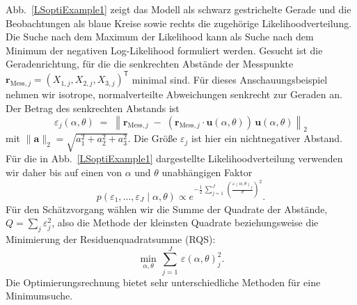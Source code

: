 Abb.~\ref{LSoptiExample1} zeigt das Modell als schwarz gestrichelte Gerade und die
Beobachtungen als blaue Kreise sowie rechts die zugehörige Likelihoodverteilung. Die Suche
nach dem Maximum der Likelihood kann als Suche nach dem Minimum der negativen
Log-Likelihood formuliert werden. Gesucht ist die Geradenrichtung, für die die
senkrechten Abstände der Messpunkte
$\mathbf{r}_{\mathrm{Mess},j}=(X_{1,j},X_{2,j},X_{3,j})^\mathsf{T}$ minimal sind.
Für dieses Anschauungsbeispiel nehmen wir isotrope, normalverteilte Abweichungen
senkrecht zur Geraden an. Der Betrag des senkrechten Abstands ist
\begin{equation}
\varepsilon_j(\alpha,\theta) \; = \; \left\lVert \mathbf{r}_{\mathrm{Mess},j} \; - \;
( \mathbf{r}_{\mathrm{Mess},j} \cdot \mathbf{u}(\alpha,\theta) ) \, \mathbf{u}(\alpha,\theta) \right\rVert_2
\end{equation}
mit $\lVert\mathbf{a}\rVert_2=\sqrt{a_1^2+a_2^2+a_3^2}$. Die Größe
$\varepsilon_j$ ist hier ein nichtnegativer Abstand. Für die in Abb.~\ref{LSoptiExample1}
dargestellte Likelihoodverteilung verwenden wir daher bis auf einen von $\alpha$ und
$\theta$ unabhängigen Faktor
\begin{equation}
p(\varepsilon_1,\dots,\varepsilon_J \mid \alpha, \theta)
\propto e^{-\frac{1}{2} \, \sum\limits_{j=1}^J \, \left(\frac{\varepsilon(\alpha,\theta)_j}{\sigma} \right)^2} .
\end{equation}
Für den Schätzvorgang wählen wir die Summe der Quadrate der Abstände,
$Q=\sum_j\varepsilon_j^2$, also die Methode der kleinsten Quadrate beziehungsweise
die Minimierung der Residuenquadratsumme (RQS):
\begin{equation}
\min_{\alpha,\theta} \, \sum\limits_{j=1}^J \, \varepsilon(\alpha,\theta)_j^2 .
\end{equation}
Die Optimierungsrechnung bietet sehr unterschiedliche Methoden für eine Minimumsuche.

